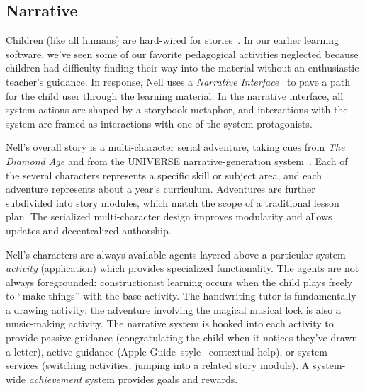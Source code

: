 \documentclass[preprint]{sig-alternate}
\begin{document}

\subsection{Narrative}

Children (like all humans) are hard-wired for stories~\cite{boyd:stories}.
In our earlier learning software, we've seen some of our favorite
pedagogical activities neglected because children had difficulty
finding their way into the material without an enthusiastic teacher's
guidance.  In response, Nell uses a
\textit{Narrative Interface}~\cite{bizzocchi:narrative,don:narrative}
to pave a path for the child user through the learning material.
In the narrative interface, all system actions are shaped by a
storybook metaphor, and
interactions with the system are framed as interactions with one of the
system protagonists.

Nell's overall story is a multi-character serial adventure, taking
cues from \textit{The Diamond Age} and
from the UNIVERSE narrative-generation system~\cite{lebowitz:universe85}.
Each of the several characters represents a specific skill or subject
area, and each adventure represents about a year's curriculum.
Adventures are further subdivided into story modules, which match the
scope of a traditional lesson plan.  The serialized multi-character
design improves modularity and allows updates and decentralized
authorship.


Nell's characters are
always-available agents layered above a particular system \textit{activity}
(application) which provides specialized functionality.  The agents
are not always foregrounded: constructionist learning occurs when the
child plays freely to ``make things'' with the base activity.
The handwriting tutor is fundamentally a drawing activity; the
adventure involving the magical musical lock is also a music-making activity.
The narrative system is
hooked into each activity to provide passive guidance
(congratulating the child when it notices they've drawn a letter),
active guidance (Apple-Guide--style~\cite{powers:appleguide}
contextual help), or system services (switching activities; jumping into a
related story module).  A system-wide \textit{achievement} system provides
goals and rewards.
\end{document}
